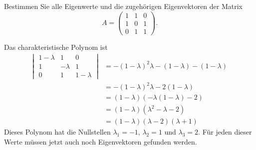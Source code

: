 Bestimmen Sie alle Eigenwerte und die zugehörigen Eigenvektoren der Matrix
\[
A=\begin{pmatrix}
1&1&0\\
1&0&1\\
0&1&1
\end{pmatrix}.
\]


\begin{loesung}
Das charakteristische Polynom ist
\begin{align*}
\left|\;\begin{matrix}
1-\lambda&1&0\\
1&-\lambda&1\\
0&1&1-\lambda
\end{matrix}\;\right|
&=
-(1-\lambda)^2\lambda-(1-\lambda)-(1-\lambda)\\
&=
-(1-\lambda)^2\lambda-2(1-\lambda)\\
&=
(1-\lambda)(-\lambda(1-\lambda)-2)\\
&=
(1-\lambda)(\lambda^2-\lambda-2)\\
&=
(1-\lambda)(\lambda -2 )(\lambda+1)
\end{align*}
Dieses Polynom hat die Nullstellen $\lambda_1=-1$, $\lambda_2=1$
und $\lambda_3=2$. Für jeden dieser Werte müssen jetzt auch noch
Eigenvektoren gefunden werden.


\end{loesung}
